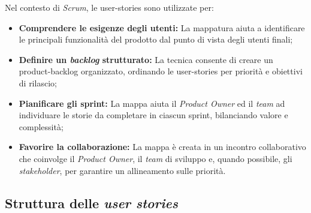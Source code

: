 \noindent Nel contesto di \textit{Scrum}, le \gls{user-stories} sono utilizzate per:

\begin{itemize}
    \item \textbf{Comprendere le esigenze degli utenti:} La mappatura aiuta a identificare le principali funzionalità del prodotto dal punto di vista degli utenti finali;
    \item \textbf{Definire un \textit{backlog} strutturato:} La tecnica consente di creare un \gls{product-backlog} organizzato, ordinando le \gls{user-stories} per priorità e obiettivi di rilascio;
    \item \textbf{Pianificare gli \gls{sprint}:} La mappa aiuta il \textit{Product Owner} ed il \textit{team} ad individuare le storie da completare in ciascun \gls{sprint}, bilanciando valore e complessità;
    \item \textbf{Favorire la collaborazione:} La mappa è creata in un incontro collaborativo che coinvolge il \textit{Product Owner}, il \textit{team} di sviluppo e, quando possibile, gli \textit{stakeholder}, per garantire un allineamento sulle priorità.
\end{itemize}

\pagebreak
\subsection*{Struttura delle \textit{user stories}}\\

